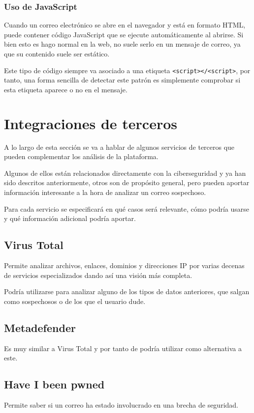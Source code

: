 \subsubsection{Uso de JavaScript}
Cuando un correo electrónico se abre en el navegador y está en formato HTML, puede contener código JavaScript que se ejecute automáticamente al abrirse. Si bien esto es hago normal en la web, no suele serlo en un mensaje de correo, ya que su contenido suele ser estático. 

Este tipo de código siempre va asociado a una etiqueta \verb|<script></<script>|, por tanto, una forma sencilla de detectar este patrón es simplemente comprobar si esta etiqueta aparece o no en el mensaje. 

\section{Integraciones de terceros}
A lo largo de esta sección se va a hablar de algunos servicios de terceros que pueden complementar los análisis de la plataforma. 

Algunos de ellos están relacionados directamente con la ciberseguridad y ya han sido descritos anteriormente, otros son de propósito general, pero pueden aportar información interesante a la hora de analizar un correo sospechoso. 

Para cada servicio se especificará en qué casos será relevante, cómo podría usarse y qué información adicional podría aportar.

\subsection{Virus Total}
Permite analizar archivos, enlaces, dominios y direcciones IP por varias decenas de servicios especializados dando así una visión más completa. 

Podría utilizarse para analizar alguno de los tipos de datos anteriores, que salgan como sospechosos o de los que el usuario dude.

\subsection{Metadefender}
Es muy similar a Virus Total y por tanto de podría utilizar como alternativa a este. 

\subsection{Have I been pwned}
Permite saber si un correo ha estado involucrado en una brecha de seguridad. 

